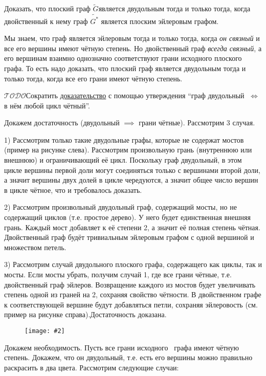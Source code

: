 \documentclass[a4paper,12pt]{article}
\numberwithin{figure}{section}
\def\IFF{$\;\Longleftrightarrow\;$}
\def\TODO{\guillemotleft$\mathcal{TODO}$\guillemotright\textellipsis}
\def\Gwave{$\tilde{G}$}
\newcommand\CenterFigure[2]{\begin{figure}[H]\centering\texttt{[image: \#2]}\end{figure}}
\begin{document}
\begin{problem}
	Доказать, что плоский граф \Gwave является двудольным тогда и только тогда, когда двойственный к нему граф $\tilde{G^*}$ является плоским эйлеровым графом.
\end{problem}
\begin{solution}
	Мы знаем, что граф является эйлеровым тогда и только тогда, когда \textit{он связный} и все его вершины имеют чётную степень. Но двойственный граф \textit{всегда связный}, а его вершинам взаимно однозначно соответствуют грани исходного плоского графа. То есть надо доказать, что плоский граф является двудольным тогда и только тогда, когда все его грани имеют чётную степень.
	
	\TODO Сократить \href{https://stepik.org/lesson/12345/step/8}{доказательство} с помощью утверждения ``граф двудольный \IFF в нём любой цикл чётный''.

	Докажем достаточность (двудольный $\implies$ грани чётные). Рассмотрим 3 случая.
	
	1) Рассмотрим только такие двудольные графы, которые не содержат мостов (пример на рисунке слева). Рассмотрим произвольную грань (внутреннюю или внешнюю) и ограничивающий её цикл. Поскольку граф двудольный, в этом цикле вершины первой доли могут соединяться только с вершинами второй доли, а значит вершины двух долей в цикле чередуются, а значит общее число вершин в цикле чётное, что и требовалось доказать.
	
	2) Рассмотрим произвольный двудольный граф, содержащий мосты, но не содержащий циклов (т.е. простое дерево). У него будет единственная внешняя грань. Каждый мост добавляет к её степени 2, а значит её полная степень чётная. Двойственный граф будёт тривиальным эйлеровым графом с одной вершиной и множеством петель.

	3) Рассмотрим случай двудольного плоского графа, содержащего как циклы, так и мосты. Если мосты убрать, получим случай 1, где все грани чётные, т.е. двойственный граф эйлеров. Возвращение каждого из мостов будет увеличивать степень одной из граней на 2, сохраняя свойство чётности. В двойственном графе к соответствующей вершине будут добавляться петли, сохраняя эйлеровость (см. пример на рисунке справа).Достаточность доказана.

	\CenterFigure{8cm}{flat-is-bipartite-iff-dual-is-euler.png}

	Докажем необходимость. Пусть все грани исходного  графа имеют чётную степень. Докажем, что он двудольный, т.е. есть его вершины можно правильно раскрасить в два цвета. Рассмотрим следующие случаи:
	

\end{solution}
\end{document}
